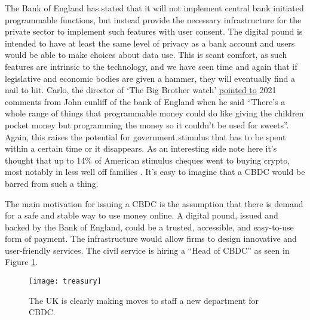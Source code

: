 \begin{itemize}
The Bank of England has stated that it will not implement central bank initiated programmable functions, but instead provide the necessary infrastructure for the private sector to implement such features with user consent. The digital pound is intended to have at least the same level of privacy as a bank account and users would be able to make choices about data use. This is scant comfort, as such features are intrinsic to the technology, and we have seen time and again that if legislative and economic bodies are given a hammer, they will eventually find a nail to hit. Carlo, the director of `The Big Brother watch' \href{https://twitter.com/silkiecarlo/status/1622912736102346752}{pointed to} 2021 comments from John cunliff of the bank of England when he said ``There’s a whole range of things that programmable money could do like giving the children pocket money but programming the money so it couldn’t be used for sweets''. Again, this raises the potential for government stimulus that has to be spent within a certain time or it disappears. As an interesting side note here it's thought that up to 14\% of American stimulus cheques went to buying crypto, most notably in less well off families \cite{bertomeu2023uncle}. It's easy to imagine that a CBDC would be barred from such a thing.\par 
The main motivation for issuing a CBDC is the assumption that there is demand for a safe and stable way to use money online. A digital pound, issued and backed by the Bank of England, could be a trusted, accessible, and easy-to-use form of payment. The infrastructure would allow firms to design innovative and user-friendly services. The civil service is hiring a ``Head of CBDC'' as seen in Figure \ref{fig:treasury}.
\begin{figure}
  \centering
    \texttt{[image: treasury]}
  \caption{The UK is clearly making moves to staff a new department for CBDC.}
  \label{fig:treasury}
\end{figure}


\end{itemize}
